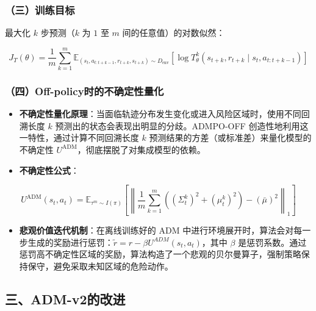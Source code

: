 \hypertarget{ux4e09ux8badux7ec3ux76eeux6807}{%
\subsubsection{（三）训练目标}\label{ux4e09ux8badux7ec3ux76eeux6807}}

最大化 \(k\) 步预测（\(k\) 为 \(1\) 至 \(m\) 间的任意值）的对数似然：

\[
J_T(\theta)
=
\frac{1}{m}
\sum_{k=1}^{m}
\mathbb{E}_{(s_t,a_{t:t+k-1},r_{t+k},s_{t+k}) \sim D_{\mathrm{env}}}
\left[
\log T_{\theta}^{k}(s_{t+k}, r_{t+k} \mid s_t, a_{t:t+k-1})
\right]
\]

\hypertarget{ux56dboff-policyux65f6ux7684ux4e0dux786eux5b9aux6027ux91cfux5316}{%
\subsubsection{（四）Off-policy时的不确定性量化}\label{ux56dboff-policyux65f6ux7684ux4e0dux786eux5b9aux6027ux91cfux5316}}

\begin{itemize}
\tightlist
\item
  \textbf{不确定性量化原理}：当面临轨迹分布发生变化或进入风险区域时，使用不同回溯长度 \(k\) 预测出的状态会表现出明显的分歧。ADMPO-OFF 创造性地利用这一特性，通过计算不同回溯长度 \(k\) 预测结果的方差（或标准差）来量化模型的不确定性 \(U^{\mathrm{ADM}}\)，彻底摆脱了对集成模型的依赖。
\item
  \textbf{不确定性公式}：
\end{itemize}

\[
U^{\mathrm{ADM}}(s_t, a_t)
=
\mathbb{E}_{\tau^m \sim I(\pi)}
\left[
\left\|
\frac{1}{m}
\sum_{k=1}^{m}
\left(
(\Sigma_{t}^{k})^{2}
+(\mu_t^{k})^{2}
\right)
-
(\bar{\mu})^{2}
\right\|_1
\right]
\]

\begin{itemize}
\tightlist
\item
  \textbf{悲观价值迭代机制}：在离线训练好的 ADM 中进行环境展开时，算法会对每一步生成的奖励进行惩罚：\(\tilde{r}=r-\beta U^{ADM}(s_t,a_t)\)，其中 \(\beta\) 是惩罚系数。通过惩罚高不确定性区域的奖励，算法构造了一个悲观的贝尔曼算子，强制策略保持保守，避免采取未知区域的危险动作。
\end{itemize}

\hypertarget{ux4e09adm-v2ux7684ux6539ux8fdb}{%
\subsection{三、ADM-v2的改进}\label{ux4e09adm-v2ux7684ux6539ux8fdb}}

